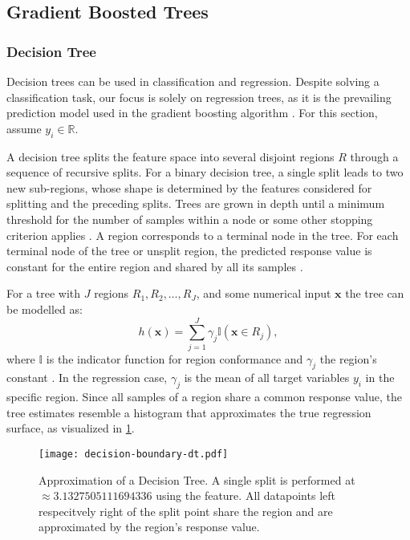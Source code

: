 \subsection{Gradient Boosted Trees}\label{sec:gradient-boosted-trees}

\subsubsection{Decision Tree}\label{sec:decision-tree}

Decision trees can be used in classification and regression. Despite solving a classification task, our focus is solely on regression trees, as it is the prevailing prediction model used in the gradient boosting algorithm \autocite[][9]{friedmanAdditiveLogisticRegression2000}. For this section, assume $y_i \in \mathbb{R}$.

A decision tree splits the feature space into several disjoint regions $R$ through a sequence of recursive splits. For a binary decision tree, a single split leads to two new sub-regions, whose shape is determined by the features considered for splitting and the preceding splits. Trees are grown in depth until a minimum threshold for the number of samples within a node or some other stopping criterion applies \autocite[][42]{breimanClassificationRegressionTrees2017}.
A region corresponds to a terminal node in the tree. For each terminal node of the tree or unsplit region, the predicted response value is constant for the entire region and shared by all its samples \autocite[][229]{breimanClassificationRegressionTrees2017}.

For a tree with $J$ regions $R_1, R_2,\ldots, R_J$, and some numerical input $\mathbf{x}$ the tree can be modelled as:
\begin{equation}
    h(\mathbf{x})=\sum_{j=1}^{J} \gamma_{j} \mathbb{I}\left(\mathbf{x} \in R_{j}\right),
    \label{eq:decision-tree}
\end{equation}
where $\mathbb{I}$ is the indicator function for region conformance and $\gamma_j$ the region's constant \autocite[][326]{hastietrevorElementsStatisticalLearning2009}. In the regression case, $\gamma_j$ is the mean of all target variables $y_i$ in the specific region. Since all samples of a region share a common response value, the tree estimates resemble a histogram that approximates the true regression surface, as visualized in \cref{fig:decision-boundary-dt}.

\begin{figure}[h]
    \centering
    \texttt{[image: decision-boundary-dt.pdf]}
    \caption[Approximation of Decision Tree]{Approximation of a Decision Tree. A single split is performed at $\approx\num{3.1327505111694336}$ using the feature. All datapoints left respecitvely right of the split point share the region and are approximated by the region's response value.}
    \label{fig:decision-boundary-dt}
\end{figure}


